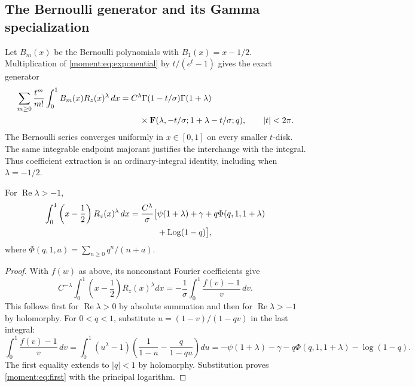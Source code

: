 \subsection{The Bernoulli generator and its Gamma specialization}

Let $B_m(x)$ be the Bernoulli polynomials with
$B_1(x)=x-1/2$. Multiplication of
\eqref{moment:eq:exponential} by $t/(e^t-1)$ gives the exact generator
\begin{align}\label{moment:eq:bernoulli-general}
 \sum_{m\ge0}\frac{t^m}{m!}
   \int_0^1 B_m(x)R_z(x)^\lambda\,dx
 ={}&C^\lambda\Gamma(1-t/\sigma)\Gamma(1+\lambda)\notag\\
 &\quad\times
 \mathbf F(\lambda,-t/\sigma;1+\lambda-t/\sigma;q),
 \qquad |t|<2\pi.
\end{align}
The Bernoulli series converges uniformly in $x\in[0,1]$ on every
smaller $t$-disk. The same integrable endpoint majorant justifies the
interchange with the integral. Thus coefficient extraction is an
ordinary-integral identity, including when $\lambda=-1/2$.

\begin{corollary}
\label{moment:cor:first}
For $\operatorname{Re}\lambda>-1$,
\begin{align}\label{moment:eq:first}
 \int_0^1\left(x-\frac12\right)R_z(x)^\lambda\,dx
 =\frac{C^\lambda}{\sigma}\bigl[&\psi(1+\lambda)+\gamma
    +q\Phi(q,1,1+\lambda)\notag\\
    &+\operatorname{Log}(1-q)\bigr],
\end{align}
where $\Phi(q,1,a)=\sum_{n\ge0}q^n/(n+a)$.
\end{corollary}
\begin{proof}
With $f(w)$ as above, its nonconstant Fourier coefficients give
\[
 C^{-\lambda}\int_0^1\left(x-\frac12\right)R_z(x)^\lambda dx
       =-\frac1\sigma\int_0^1\frac{f(v)-1}{v}\,dv.
\]
This follows first for $\operatorname{Re}\lambda>0$ by absolute
summation and then for $\operatorname{Re}\lambda>-1$ by holomorphy.
For $0<q<1$, substitute $u=(1-v)/(1-qv)$ in the last integral:
\[
 \int_0^1\frac{f(v)-1}{v}\,dv
 =\int_0^1(u^\lambda-1)
       \left(\frac1{1-u}-\frac q{1-qu}\right)du
 =-\psi(1+\lambda)-\gamma-q\Phi(q,1,1+\lambda)
      -\log(1-q).
\]
The first equality extends to $|q|<1$ by holomorphy. Substitution
proves \eqref{moment:eq:first} with the principal logarithm.
\end{proof}


